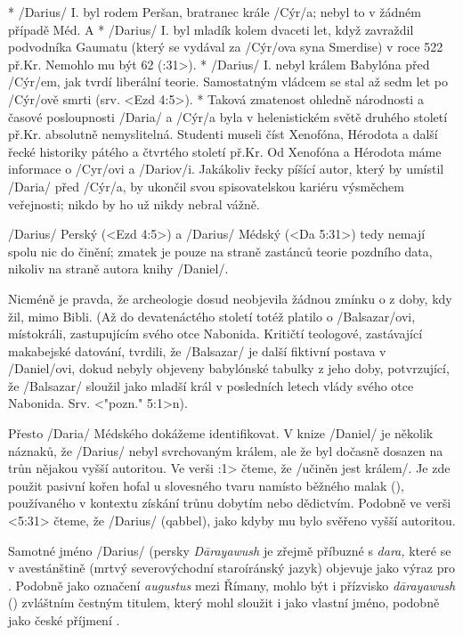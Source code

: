 * \x/Darius/ I. byl rodem Peršan, bratranec krále \x/Cýr/a; nebyl to v žádném případě Méd.
  \putCite A\right
* \x/Darius/ I. byl mladík kolem dvaceti let, když zavraždil podvodníka Gaumatu (který se vydával za \x/Cýr/ova syna Smerdise) v roce 522 př.Kr.  Nemohlo mu být 62 (:31>). 
* \x/Darius/ I. nebyl králem Babylóna před \x/Cýr/em, jak tvrdí liberální teorie. Samostatným vládcem se stal až sedm let po \x/Cýr/ově smrti (srv. <Ezd 4:5>).
* Taková zmatenost ohledně národnosti a časové posloupnosti \x/Daria/ a \x/Cýr/a byla v helenistickém světě druhého století př.Kr. absolutně nemyslitelná.
Studenti museli číst Xenofóna,  Hérodota a další řecké historiky pátého a čtvrtého století př.Kr. Od Xenofóna a Hérodota máme informace o \x/Cyr/ovi a \x/Dariov/i.
Jakákoliv řecky píšící autor, který by umístil \x/Daria/ před \x/Cýr/a, by ukončil svou spisovatelskou kariéru výsměchem veřejnosti; nikdo by ho už nikdy nebral vážně.  

\enditems

\x/Darius/ Perský (<Ezd 4:5>) a \x/Darius/ Médský (<Da 5:31>) tedy nemají spolu nic do činění; zmatek je pouze na straně zastánců teorie pozdního data, nikoliv na straně autora knihy \x/Daniel/.

Nicméně je pravda, že archeologie dosud neobjevila žádnou zmínku o  z doby, kdy žil, mimo Bibli.
(Až do devatenáctého století totéž platilo o \x/Balsazar/ovi, místokráli, zastupujícím svého otce Nabonida. Kritičtí teologové, zastávající makabejské datování, tvrdili, že
\x/Balsazar/ je další fiktivní postava v \x/Daniel/ovi, dokud nebyly objeveny babylónské tabulky z jeho doby,  potvrzující, že \x/Balsazar/ sloužil jako mladší král v posledních letech vlády svého otce Nabonida. Srv. <"pozn." 5:1>n).

Přesto \x/Daria/ Médského dokážeme identifikovat.
V knize \x/Daniel/ je několik náznaků, že \x/Darius/ nebyl svrchovaným králem, ale že byl dočasně dosazen na trůn nějakou vyšší autoritou.
Ve verši :1> čteme, že \x/učiněn jest králem/. Je zde použit pasivní kořen hofal u slovesného tvaru  namísto běžného malak (), používaného v kontextu získání trůnu dobytím nebo dědictvím.
Podobně ve verši <5:31> čteme, že \x/Darius/  (qabbel), jako kdyby mu bylo svěřeno vyšší autoritou.

Samotné jméno \x/Darius/ (persky {\it D\oldaccents\=arayawush\/} je zřejmě příbuzné s {\it dara,\/} které se v avestánštině (mrtvý severovýchodní staroíránský jazyk) objevuje jako
výraz pro . Podobně jako označení {\it augustus\/} mezi Římany, mohlo být i přízvisko {\it d\oldaccents\=arayawush\/} () zvláštním čestným titulem, který
mohl sloužit i jako vlastní jméno, podobně jako české příjmení .

